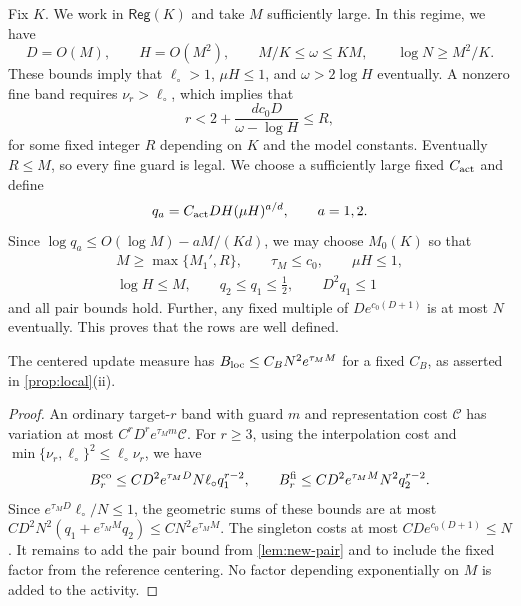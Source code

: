 Fix $K$. We work in $\mathsf{Reg}(K)$ and take $M$ sufficiently large.
In this regime, we have
\begin{equation}\label{eq:LB-hierarchy}
 D=O(M),\qquad H=O(M^2),\qquad
 M/K\le\omega\le KM,\qquad \log N\ge M^2/K.
\end{equation}
These bounds imply that $\ell_\circ>1$, $\mu H\le1$, and
$\omega>2\log H$ eventually. A nonzero fine band requires
$\nu_r>\ell_\circ$, which implies that
\[
 r<2+\frac{dc_0D}{\omega-\log H}\le R,
\]
for some fixed integer $R$ depending on $K$ and the model constants.
Eventually $R\le M$, so every fine guard is legal.
We choose a sufficiently large fixed $C_{\rm act}$ and define
\begin{equation}\label{eq:LB-alias-constants}
 q_a=C_{\rm act}DH(\mu H)^{a/d},\qquad a=1,2.
\end{equation}
Since $\log q_a\le O(\log M)-aM/(Kd)$, we may choose $M_0(K)$ so that
\begin{equation}\label{eq:LB-row-small}
 \begin{gathered}
 M\ge\max\{M_1',R\},\qquad \tau_M\le c_0,\qquad
 \mu H\le1,\\ \log H\le M,\qquad
 q_2\le q_1\le\tfrac12,\qquad D^2q_1\le1
 \end{gathered}
\end{equation}
and all pair bounds hold. Further, any fixed multiple of
$De^{c_0(D+1)}$ is at most $N$ eventually. This proves that the rows are
well defined.

\begin{lemma}\label{lem:activity}
The centered update measure has $B_{\rm loc}\le C_BN^2e^{\tau_MM}$
for a fixed $C_B$, as asserted in \cref{prop:local}(ii).
\end{lemma}
\begin{proof}
An ordinary target-$r$ band with guard $m$ and representation cost
$\mathcal C$ has variation at most $C^rD^re^{\tau_Mm}\mathcal C$.
For $r\ge3$, using the interpolation cost and
$\min\{\nu_r,\ell_\circ\}^2\le\ell_\circ\nu_r$, we have
\[
 B_r^{\rm co}\le CD^2e^{\tau_MD}N\ell_\circ q_1^{r-2},\qquad
 B_r^{\rm fi}\le CD^2e^{\tau_MM}N^2q_2^{r-2}.
\]
Since $e^{\tau_MD}\ell_\circ/N\le1$, the geometric sums of these bounds
are at most $CD^2N^2(q_1+e^{\tau_MM}q_2)\le CN^2e^{\tau_MM}$.
The singleton costs at most $CDe^{c_0(D+1)}\le N$.
It remains to add the pair bound from \cref{lem:new-pair} and to include
the fixed factor from the reference centering. No factor depending exponentially on $M$ is added
to the activity.
\end{proof}

